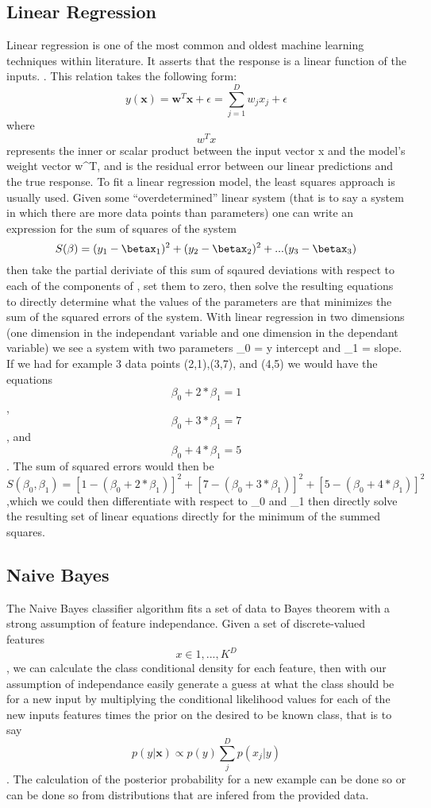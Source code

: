 \documentclass[a4paper,11pt]{article}
\begin{document}
\subsection{Linear Regression}
Linear regression is one of the most common and oldest machine learning techniques within
literature. It asserts that the response is a linear function of the inputs. \cite{murphy}.
This relation takes the following form:
$$ y(\textbf{x}) = \textbf{w}^T\textbf{x} + \epsilon = \sum_{j=1}^{D}w_jx_j + \epsilon $$
where $$w^Tx$$ represents the inner or scalar product between the input vector x and the
model's weight vector w^T, and \epsilon is the residual error between our linear predictions
and the true response.
To fit a linear regression model, the least squares approach is usually used. Given some
 ``overdetermined'' linear system (that is to say a system in which there are more data points
 than parameters) one can write an expression for the sum of squares of the system $$S(\beta) =
 (y_1 - \betax_1)^2 + (y_2 - \betax_2)^2 + ... (y_3 - \betax_3)$$ then take the partial deriviate
 of this sum of sqaured deviations with respect to each of the components of \beta, set them to
 zero, then solve the resulting equations to directly determine what the values of the parameters
 are that minimizes the sum of the squared errors of the system. With linear regression in two dimensions
 (one dimension in the independant variable and one dimension in the dependant variable) we see a system
 with two parameters \beta_0 = y intercept and \beta_1 = slope. If we had for example 3 data points
 (2,1),(3,7), and (4,5) we would have the equations $$\beta_0 + 2*\beta_1 = 1$$, $$\beta_0 + 3*\beta_1 = 7$$,
 and $$\beta_0 + 4*\beta_1 = 5$$. The sum of squared errors would then be
 $$S(\beta_0,\beta_1)= [1 - (\beta_0 + 2*\beta_1)]^2 + [7 - (\beta_0 + 3*\beta_1)]^2 + [5 - (\beta_0 + 4*\beta_1)]^2$$
 ,which we could then differentiate with respect to \beta_0 and \beta_1 then directly solve the resulting set
 of linear equations directly for the minimum of the summed squares.

 \subsection{Naive Bayes}
The Naive Bayes classifier algorithm fits a set of data to Bayes theorem with a strong assumption of
feature independance. Given a set of discrete-valued features $$x \in {1,...,K}^D$$, we can calculate
the class conditional density for each feature, then with our assumption of independance easily generate
a guess at what the class should be for a new input by multiplying the conditional likelihood values
for each of the new inputs features times the prior on the desired to be known class, that is to say
$$p(y|\textbf{x}) \propto p(y) \sum_{j}^{D}p(x_j|y)$$. The calculation of the posterior probability for a new
example can be done so  or can be done so from distributions that are infered from the
provided data.
\end{document}

